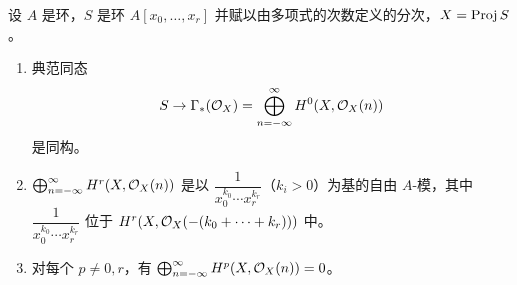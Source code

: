 \begin{proposition}\label{it:2.4.11}
设 $A$ 是环，$S$ 是环 $A[x_0,\dots,x_r]$ 并赋以由多项式的次数定义的分次，$X=\operatorname{Proj} S$。
\begin{enumerate}[label=(\roman*),leftmargin=2.2em]
  \item 典范同态
  \[
  S\to\Gamma_*(\mathcal{O}_X)=\bigoplus_{n=-\infty}^{\infty}H^0(X,\mathcal{O}_X(n))
  \]
  是同构。
  \item $\bigoplus_{n=-\infty}^{\infty}H^r(X,\mathcal{O}_X(n))$ 是以 $\dfrac{1}{x_0^{k_0}\cdots x_r^{k_r}}$（$k_i>0$）为基的自由 $A$-模，其中 $\dfrac{1}{x_0^{k_0}\cdots x_r^{k_r}}$ 位于 $H^r(X,\mathcal{O}_X(-(k_0+\cdots+k_r)))$ 中。
  \item 对每个 $p\ne 0,r$，有 $\bigoplus_{n=-\infty}^{\infty}H^p(X,\mathcal{O}_X(n))=0$。
\end{enumerate}
\end{proposition}

